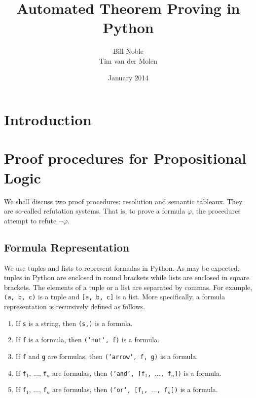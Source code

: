 \documentclass[a4paper,notitlepage]{scrartcl}
\title{Automated Theorem Proving in Python}
\author{Bill Noble\\ Tim van der Molen}
\date{January 2014}
\let\phi\varphi
\begin{document}
\maketitle

\section{Introduction}

\section{Proof procedures for Propositional Logic}

We shall discuss two proof procedures: resolution and semantic tableaux. They
are so-called refutation systems. That is, to prove a formula $\phi$, the
procedures attempt to refute $\lnot\phi$.

\subsection{Formula Representation}

We use tuples and lists to represent formulas in Python.
As may be expected, tuples in Python are enclosed in round brackets while lists
are enclosed in square brackets.
The elements of a tuple or a list are separated by commas.
For example, \texttt{(a, b, c)} is a tuple and \texttt{[a, b, c]} is a list.
More specifically, a formula representation is recursively defined as follows.

\begin{enumerate}

\item
If \texttt{s} is a string, then \texttt{(s,)} is a formula.

\item
If \texttt{f} is a formula, then \texttt{('not', f)} is a formula.

\item
If \texttt{f} and \texttt{g} are formulas, then \texttt{('arrow', f, g)} is a
formula.

\item
If \texttt{f}$_1$, $\ldots$, \texttt{f}$_n$ are formulas, then \texttt{('and',
[f$_1$, $\ldots$, f$_n$])} is a formula.

\item
If \texttt{f}$_1$, $\ldots$, \texttt{f}$_n$ are formulas, then \texttt{('or',
[f$_1$, $\ldots$, f$_n$])} is a formula.
\end{enumerate}
\end{document}
